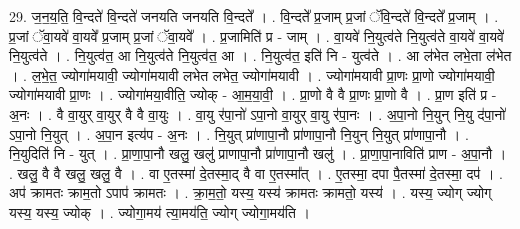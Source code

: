 \documentclass[17pt]{extarticle}
\begin{document}
29. ज॒न॒य॒ति॒ वि॒न्दते॑ वि॒न्दते॑ जनयति जनयति वि॒न्दते᳚ । . वि॒न्दते᳚ प्र॒जाम् प्र॒जां ॅवि॒न्दते॑ वि॒न्दते᳚ प्र॒जाम् । . प्र॒जां ॅवा॒यवे॑ वा॒यवे᳚ प्र॒जाम् प्र॒जां ॅवा॒यवे᳚ । . प्र॒जामिति॑ प्र - जाम् । . वा॒यवे॑ नि॒युत्व॑ते नि॒युत्व॑ते वा॒यवे॑ वा॒यवे॑ नि॒युत्व॑ते । . नि॒युत्व॑त॒ आ नि॒युत्व॑ते नि॒युत्व॑त॒ आ । . नि॒युत्व॑त॒ इति॑ नि - युत्व॑ते । . आ ल॑भेत लभे॒ता ल॑भेत । . ल॒भे॒त॒ ज्योगा॑मयावी॒ ज्योगा॑मयावी लभेत लभेत॒ ज्योगा॑मयावी । . ज्योगा॑मयावी प्रा॒णः प्रा॒णो ज्योगा॑मयावी॒ ज्योगा॑मयावी प्रा॒णः । . ज्योगा॑मया॒वीति॒ ज्योक् - आ॒म॒या॒वी॒ । . प्रा॒णो वै वै प्रा॒णः प्रा॒णो वै । . प्रा॒ण इति॑ प्र - अ॒नः । . वै वा॒युर् वा॒युर् वै वै वा॒युः । . वा॒यु र॑पा॒नो॑ ऽपा॒नो वा॒युर् वा॒यु र॑पा॒नः । . अ॒पा॒नो नि॒युन् नि॒यु द॑पा॒नो॑ ऽपा॒नो नि॒युत् । . अ॒पा॒न इत्य॑प - अ॒नः । . नि॒युत् प्रा॑णापा॒नौ प्रा॑णापा॒नौ नि॒युन् नि॒युत् प्रा॑णापा॒नौ । . नि॒युदिति॑ नि - युत् । . प्रा॒णा॒पा॒नौ खलु॒ खलु॑ प्राणापा॒नौ प्रा॑णापा॒नौ खलु॑ । . प्रा॒णा॒पा॒नाविति॑ प्राण - अ॒पा॒नौ । . खलु॒ वै वै खलु॒ खलु॒ वै । . वा ए॒तस्मा॑ दे॒तस्मा॒द् वै वा ए॒तस्मा᳚त् । . ए॒तस्मा॒ दपा पै॒तस्मा॑ दे॒तस्मा॒ दप॑ । . अप॑ क्रामतः क्राम॒तो ऽपाप॑ क्रामतः । . क्रा॒म॒तो॒ यस्य॒ यस्य॑ क्रामतः क्रामतो॒ यस्य॑ । . यस्य॒ ज्योग् ज्योग् यस्य॒ यस्य॒ ज्योक् । . ज्योगा॒मय॑ त्या॒मय॑ति॒ ज्योग् ज्योगा॒मय॑ति । \newline
\end{document}
